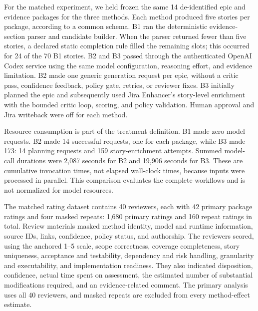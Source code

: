 \documentclass[manuscript,review]{acmart}
\begin{document}
For the matched experiment, we held frozen the same 14 de-identified epic and evidence packages for the three methods. Each method produced five stories per package, according to a common schema. B1 ran the deterministic evidence-section parser and candidate builder. When the parser returned fewer than five stories, a declared static completion rule filled the remaining slots; this occurred for 24 of the 70 B1 stories. B2 and B3 passed through the authenticated OpenAI Codex service using the same model configuration, reasoning effort, and evidence limitation. B2 made one generic generation request per epic, without a critic pass, confidence feedback, policy gate, retries, or reviewer fixes. B3 initially planned the epic and subsequently used Jira Enhancer's story-level enrichment with the bounded critic loop, scoring, and policy validation. Human approval and Jira writeback were off for each method.

Resource consumption is part of the treatment definition. B1 made zero model requests. B2 made 14 successful requests, one for each package, while B3 made 173: 14 planning requests and 159 story-enrichment attempts. Summed model-call durations were 2,087 seconds for B2 and 19,906 seconds for B3. These are cumulative invocation times, not elapsed wall-clock times, because inputs were processed in parallel. This comparison evaluates the complete workflows and is not normalized for model resources.

The matched rating dataset contains 40 reviewers, each with 42 primary package ratings and four masked repeats: 1,680 primary ratings and 160 repeat ratings in total. Review materials masked method identity, model and runtime information, source IDs, links, confidence, policy status, and authorship. The reviewers scored, using the anchored 1--5 scale, scope correctness, coverage completeness, story uniqueness, acceptance and testability, dependency and risk handling, granularity and executability, and implementation readiness. They also indicated disposition, confidence, actual time spent on assessment, the estimated number of substantial modifications required, and an evidence-related comment. The primary analysis uses all 40 reviewers, and masked repeats are excluded from every method-effect estimate.
\end{document}
